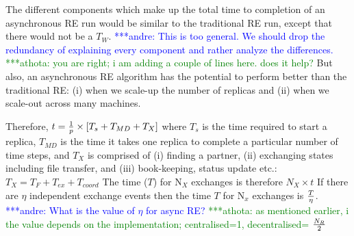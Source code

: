 \documentclass{rspublic}
\newcommand{\jhanote}[1]{ {\textcolor{red} { ***shantenu: #1 }}}
\newcommand{\alnote}[1]{ {\textcolor{blue} { ***andre: #1 }}}
\newcommand{\athotanote}[1]{ {\textcolor{green} { ***athota: #1 }}}
\newcommand{\alnote}[1]{}
\newcommand{\athotanote}[1]{}
\newcommand{\jhanote}[1]{}
\begin{document}

The different components which make up the total time to completion of 
an asynchronous RE run would be similar to the traditional RE run, 
except that there would not be a $T_W$. \alnote{This is too general. 
We should drop the redundancy of explaining every component and rather 
analyze the differences.} \athotanote{you are right; i am adding a couple of lines here. does it help?}But also, an asynchronous RE algorithm has the potential to perform better than the traditional RE: (i) when we scale-up the number of replicas and (ii) when we scale-out across many machines.

Therefore,  $t=  {1 \over p} \times {[T_s+T_{MD} + T_{X}]} $
where $T_{s}$ is the time required to start a replica, $T_{MD}$ is the time it takes one replica to complete a particular number of time steps,
and $T_{X}$ is comprised of (i) finding a partner, (ii) exchanging
states including file transfer, and (iii) book-keeping, status update
etc.: ${T_{X}} = {T_F + T_{ex} + T_{coord}}$ 
The time ($T$) for N$_{X}$ exchanges is therefore $N_{X} \times t$
If there are $\eta$ independent exchange events then the time $T$ for 
N$_x$ exchanges is $T \over \eta$. \alnote{What is the value of $\eta$ for async RE?} \athotanote{as mentioned earlier, i the value depends on the implementation; centralised=1, decentralised= $N_R\over2$}


  
\end{document}
